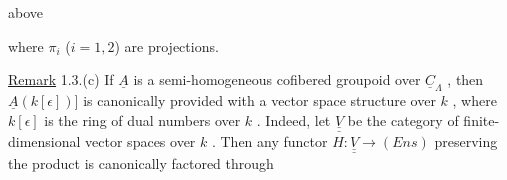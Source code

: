 \begin{center}
  above  
\end{center}
where  $\pi_{i}$  ($i = 1,2$)  are projections.

\underline{Remark} 1.3.(c)  If  $\underline{A}$  is a semi-homogeneous cofibered groupoid over  $\underline{C}_{\Lambda}$ , then
 $\underline{A}(k [\epsilon])]$ is canonically provided with a vector space structure over  $k$ , where
$k [\epsilon]$ is the ring of dual numbers over  $k$ . Indeed, let  $\underline{\underline{V}}$  be the category of
finite-dimensional vector spaces over  $k$ . Then any functor  $H : \underline{\underline{V}} \to (Ens)$
preserving the product is canonically factored through

